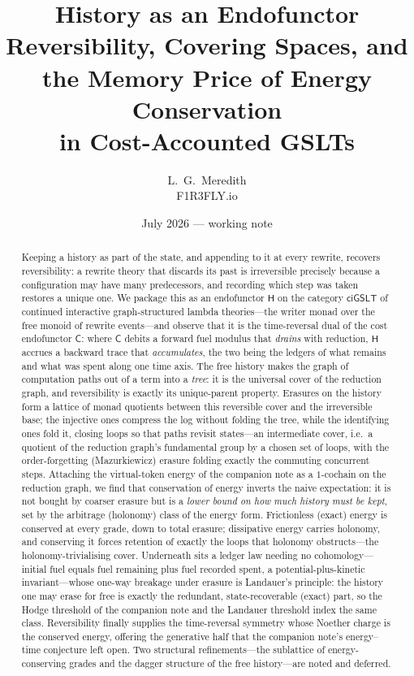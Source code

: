 \documentclass[11pt]{article}
\title{\bfseries History as an Endofunctor\\[0.35em]
\large Reversibility, Covering Spaces, and the Memory Price of Energy Conservation\\ in Cost-Accounted GSLTs}
\author{L.~G.~Meredith\\ \small F1R3FLY.io}
\date{July 2026 --- working note}
\theoremstyle{definition}
\theoremstyle{plain}
\theoremstyle{remark}
\newcommand{\cost}{\mathsf{C}}
\newcommand{\hist}{\mathsf{H}}
\newcommand{\ciGSLT}{\mathsf{ciGSLT}}
\begin{document}
\maketitle

\begin{abstract}
Keeping a history as part of the state, and appending to it at every rewrite, recovers
reversibility: a rewrite theory that discards its past is irreversible precisely because a
configuration may have many predecessors, and recording which step was taken restores a unique
one. We package this as an endofunctor $\hist$ on the category $\ciGSLT$ of continued interactive
graph-structured lambda theories---the writer monad over the free monoid of rewrite events---and
observe that it is the time-reversal dual of the cost endofunctor $\cost$: where $\cost$ debits a
forward fuel modulus that \emph{drains} with reduction, $\hist$ accrues a backward trace that
\emph{accumulates}, the two being the ledgers of what remains and what was spent along one time
axis. The free history makes the graph of computation paths out of a term into a \emph{tree}: it
is the universal cover of the reduction graph, and reversibility is exactly its unique-parent
property. Erasures on the history form a lattice of monad quotients between this reversible cover
and the irreversible base; the injective ones compress the log without folding the tree, while the
identifying ones fold it, closing loops so that paths revisit states---an intermediate cover, i.e.\
a quotient of the reduction graph's fundamental group by a chosen set of loops, with the
order-forgetting (Mazurkiewicz) erasure folding exactly the commuting concurrent steps. Attaching
the virtual-token energy of the companion note as a $1$-cochain on the reduction graph, we find
that conservation of energy inverts the naive expectation: it is not bought by coarser erasure but
is a \emph{lower bound on how much history must be kept}, set by the arbitrage (holonomy) class of
the energy form. Frictionless (exact) energy is conserved at every grade, down to total erasure;
dissipative energy carries holonomy, and conserving it forces retention of exactly the loops that
holonomy obstructs---the holonomy-trivialising cover. Underneath sits a ledger law needing no
cohomology---initial fuel equals fuel remaining plus fuel recorded spent, a potential-plus-kinetic
invariant---whose one-way breakage under erasure is Landauer's principle: the history one may erase
for free is exactly the redundant, state-recoverable (exact) part, so the Hodge threshold of the
companion note and the Landauer threshold index the same class. Reversibility finally supplies the
time-reversal symmetry whose Noether charge is the conserved energy, offering the generative half
that the companion note's energy--time conjecture left open. Two structural refinements---the
sublattice of energy-conserving grades and the dagger structure of the free history---are noted and
deferred.
\end{abstract}
\end{document}
